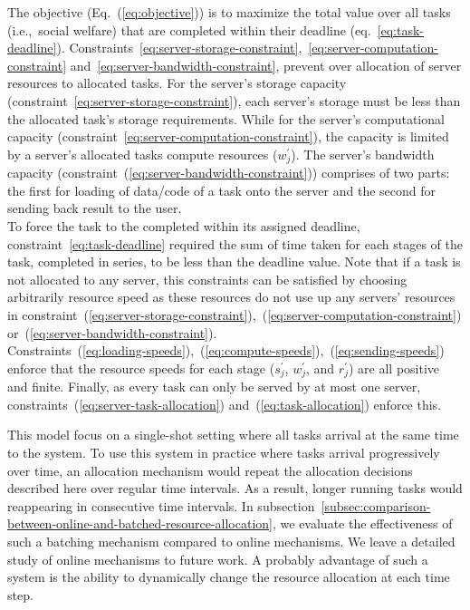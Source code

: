 The objective (Eq.~(\ref{eq:objective})) is to maximize the total value over all tasks (i.e.,\ social welfare) that
are completed within their deadline (eq.~\ref{eq:task-deadline}).
Constraints~\ref{eq:server-storage-constraint},~\ref{eq:server-computation-constraint}
and~\ref{eq:server-bandwidth-constraint}, prevent over allocation of server resources to allocated tasks.
For the server's storage capacity (constraint~\ref{eq:server-storage-constraint}), each server's storage must be less
than the allocated task's storage requirements. While for the server's computational capacity
(constraint~\ref{eq:server-computation-constraint}), the capacity is limited by a server's allocated tasks
compute resources ($w^{'}_j$). The server's bandwidth capacity (constraint~(\ref{eq:server-bandwidth-constraint}))
comprises of two parts: the first for loading of data/code of a task onto the server and the second for sending
back result to the user. \\
To force the task to the completed within its assigned deadline, constraint~\ref{eq:task-deadline} required the sum
of time taken for each stages of the task, completed in series, to be less than the deadline value.
Note that if a task is not allocated to any server, this constraints can be satisfied by choosing arbitrarily
resource speed as these resources do not use up any servers' resources in
constraint~(\ref{eq:server-storage-constraint}),~(\ref{eq:server-computation-constraint})
or~(\ref{eq:server-bandwidth-constraint}). \\
Constraints~(\ref{eq:loading-speeds}),~(\ref{eq:compute-speeds}),~(\ref{eq:sending-speeds}) enforce that the resource
speeds for each stage ($s^{'}_j$, $w^{'}_j$, and $r^{'}_j$) are all positive and finite.
Finally, as every task can only be served by at most one server, constraints~(\ref{eq:server-task-allocation})
and~(\ref{eq:task-allocation}) enforce this.

This model focus on a single-shot setting where all tasks arrival at the same time to the system. To use this system
in practice where tasks arrival progressively over time, an allocation mechanism would repeat the allocation decisions
described here over regular time intervals. As a result, longer running tasks would reappearing in consecutive time
intervals.
In subsection~\ref{subsec:comparison-between-online-and-batched-resource-allocation}, we evaluate the effectiveness of
such a batching mechanism compared to online mechanisms. We leave a detailed study of online mechanisms to future work.
A probably advantage of such a system is the ability to dynamically change the resource allocation at each time step.

